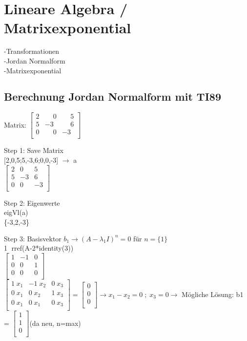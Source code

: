 \section{Lineare Algebra / Matrixexponential}
-Transformationen\\
-Jordan Normalform\\
-Matrixexponential 

\subsection{Berechnung Jordan Normalform mit TI89}
Matrix:
$\begin{bmatrix} %
	2 & \phantom{-}0 & \phantom{-}5\\
	5 & -3 & \phantom{-}6\\
	0 & \phantom{-}0 & -3\\
\end{bmatrix}$

Step 1: Save Matrix\\{}
[2,0,5;5,-3,6;0,0,-3] $\rightarrow$ a\\
\hspace*{2cm}$\begin{bmatrix} %
	2 & 0 & 5\\
	5 & -3 & 6\\
	0 & 0 & -3\\
\end{bmatrix}$

Step 2: Eigenwerte\\
eigVl(a)\\
\hspace*{2cm} \{-3,2,-3\}

Step 3: Basisvektor $b_1 \rightarrow (A- \lambda_1 I)^n = 0$ für $n=\{1\}$\\
\textcircled{1} rref(A-2*identity(3))\\
\hspace*{2cm}$\begin{bmatrix}
	1 & -1 & 0\\
	0 & 0 & 1\\
	0 & 0 & 0\\
\end{bmatrix}$\\

$\begin{bmatrix}
	1\;x_1 & -1\;x_2 & 0\;x_3\\
	0\;x_1 & 0\;x_2 & 1\;x_3\\
	0\;x_1 & 0\;x_1 & 0\;x_3\\
\end{bmatrix} = \begin{bmatrix}
	0\\
	0\\
	0\\
\end{bmatrix} \rightarrow x_1-x_2=0 \; ; \; x_3=0 \rightarrow$ Mögliche Lösung: b1 = $\begin{bmatrix}
	1\\
	1\\
	0\\
\end{bmatrix}$(da neu, n=max)\\

